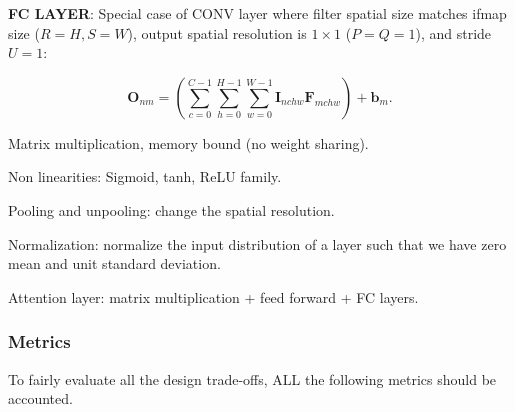 \begin{dashlist}
    
    \item \textbf{FC LAYER}:
    Special case of CONV layer where filter spatial size matches ifmap size ($R=H, S=W$), output spatial resolution is $1 \times 1$ ($P=Q=1$), and stride $U=1$:
    
    \[
    \mathbf{O}_{nm} = \left(\sum_{c=0}^{C-1} \sum_{h=0}^{H-1} \sum_{w=0}^{W-1} \mathbf{I}_{nchw} \mathbf{F}_{mchw}\right) + \mathbf{b}_m .
    \]

    Matrix multiplication, memory bound (no weight sharing).
    \item Non linearities: Sigmoid, tanh, ReLU family.
    \item Pooling and unpooling: change the spatial resolution.
    \item Normalization: normalize the input distribution of a layer such that we have zero mean and unit standard deviation.
    \item Attention layer: matrix multiplication + feed forward + FC layers.
\end{dashlist}

\subsubsection{Metrics}
To fairly evaluate all the design trade-offs, ALL the following metrics should be accounted.

